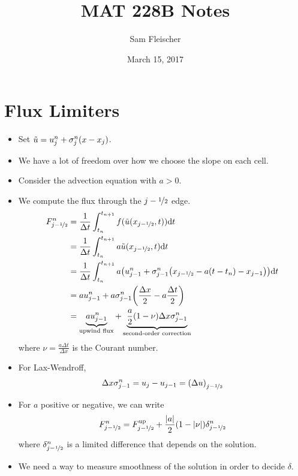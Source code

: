 \documentclass{article}
\title{MAT 228B Notes}
\author{Sam Fleischer}
\date{March 15, 2017}
\newcommand{\half}{\nicefrac{1}{2}}
\newcommand{\Dx}{\Delta x}
\newcommand{\Dt}{\Delta t}
\begin{document}
    \maketitle

    \section{Flux Limiters}

        \begin{itemize}
            \item Set $\tilde{u} = u_j^n + \sigma_j^n\qty(x - x_j)$.
            \item We have a lot of freedom over how we choose the slope on each cell.
            \item Consider the advection equation with $a > 0$.
            \item We compute the flux through the $j - \half$ edge.
            \begin{align*}
                F_{j-\half}^n &= \frac{1}{\Dt}\int_{t_n}^{t_{n+1}}f(\tilde{u}(x_{j-\half},t))\dd t \\
                &= \frac{1}{\Dt}\int_{t_n}^{t_{n+1}}a\tilde{u}(x_{j-\half},t)\dd t \\
                &= \frac{1}{\Dt}\int_{t_n}^{t_{n+1}}a\qty(u_{j-1}^n + \sigma_{j-1}^n\qty(x_{j-\half} - a\qty(t - t_n) - x_{j-1}))\dd t \\
                &= au_{j-1}^n + a\sigma_{j-1}^n\qty(\frac{\Dx}{2} - a\frac{\Dt}{2}) \\
                &= \underbrace{au_{j-1}^n}_\text{upwind flux} + \underbrace{\frac{a}{2}\qty(1 - \nu)\Dx\sigma_{j-1}^n}_\text{second-order correction}
            \end{align*}
            where $\nu = \frac{a\Dt}{\Dx}$ is the Courant number.
            \item For Lax-Wendroff,
            \begin{align*}
                \Dx\sigma_{j-1}^n = u_j - u_{j-1} = \qty(\Delta u)_{j-\half}
            \end{align*}
            \item For $a$ positive or negative, we can write
            \begin{align*}
                F_{j-\half}^n = F_{j-\half}^\text{up} + \frac{\abs{a}}{2}\qty(1 - \abs{\nu})\delta_{j-\half}^n
            \end{align*}
            where $\delta_{j-\half}^n$ is a limited difference that depends on the solution.
            \item We need a way to measure smoothness of the solution in order to decide $\delta$.

\end{itemize}
\end{document}
